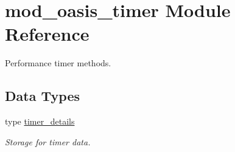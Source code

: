 \hypertarget{namespacemod__oasis__timer}{}\section{mod\+\_\+oasis\+\_\+timer Module Reference}
\label{namespacemod__oasis__timer}


Performance timer methods.  


\subsection*{Data Types}
\begin{DoxyCompactItemize}
\item 
type \hyperlink{structmod__oasis__timer_1_1timer__details}{timer\+\_\+details}
\begin{DoxyCompactList}\small\item\em Storage for timer data. \end{DoxyCompactList}\end{DoxyCompactItemize}
